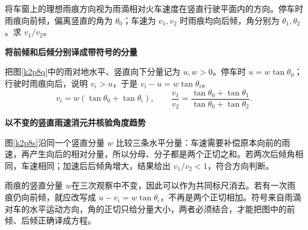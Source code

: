 \begin{question}\begin{example}[由雨痕倾角求车速比]\label{k2p8}
将车窗上的理想雨痕方向视为雨滴相对火车速度在竖直行驶平面内的方向。停车时雨痕向前倾，偏离竖直的角为 $\theta_0$；车速为 $v_1,v_2$ 时雨痕均向后倾，角分别为 $\theta_1,\theta_2$。求 $v_1/v_2$。\end{example}
\end{question}
\begin{solution}\textbf{将前倾和后倾分别译成带符号的分量}\par\nobreak
把图\ref{k2p8q}中的雨对地水平、竖直向下分量记为 $u,w>0$。停车时 $u=w\tan\theta_0$；行驶时雨痕向后，说明 $v_i>u$，于是 $v_i-u=w\tan\theta_i$。
\[v_i=w(\tan\theta_0+\tan\theta_i),\qquad\boxed{\frac{v_1}{v_2}=\frac{\tan\theta_0+\tan\theta_1}{\tan\theta_0+\tan\theta_2}}.\]



\par\medskip{}\noindent\textbf{以不变的竖直雨速消元并核验角度趋势}\par\nobreak
图\ref{k2p8s}沿同一个竖直分量 $w$ 比较三条水平分量：车速需要补偿原本向前的雨速，再产生向后的相对分量，所以分母、分子都是两个正切之和。若两次后倾角相同，车速相同；加速后后倾角增大，结果给出 $v_1/v_2<1$，符合方向判断。

雨痕的竖直分量 $w$在三次观察中不变，因此可以作为共同标尺消去。若有一次雨痕仍向前倾，就应改写成 $u-v_i=w\tan\theta_i$，不再是两个正切相加。符号来自雨滴对车的水平运动方向，角的正切只给分量大小，两者必须结合，才能把图中的前倾、后倾正确译成方程。\end{solution}


